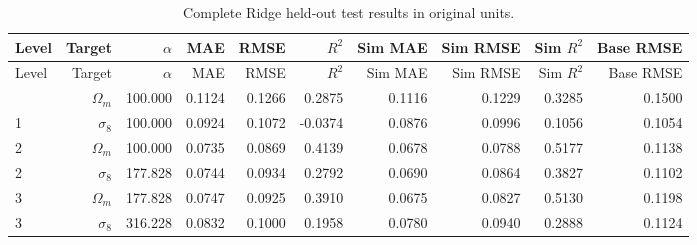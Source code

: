 \begingroup\footnotesize\setlength{\tabcolsep}{3pt}\renewcommand{\arraystretch}{1.05}
\begin{longtable}{lrrrrrrrrr}
\caption{Complete Ridge held-out test results in original units.}\label{tab:ridge}\\
\toprule
Level & Target & $\alpha$ & MAE & RMSE & $R^2$ & Sim MAE & Sim RMSE & Sim $R^2$ & Base RMSE \\
\midrule
\endfirsthead
\toprule
Level & Target & $\alpha$ & MAE & RMSE & $R^2$ & Sim MAE & Sim RMSE & Sim $R^2$ & Base RMSE \\
\midrule\endhead
\bottomrule\endfoot
1 & $\Omega_m$ & 100.000 & 0.1124 & 0.1266 & 0.2875 & 0.1116 & 0.1229 & 0.3285 & 0.1500 \\
1 & $\sigma_8$ & 100.000 & 0.0924 & 0.1072 & -0.0374 & 0.0876 & 0.0996 & 0.1056 & 0.1054 \\
2 & $\Omega_m$ & 100.000 & 0.0735 & 0.0869 & 0.4139 & 0.0678 & 0.0788 & 0.5177 & 0.1138 \\
2 & $\sigma_8$ & 177.828 & 0.0744 & 0.0934 & 0.2792 & 0.0690 & 0.0864 & 0.3827 & 0.1102 \\
3 & $\Omega_m$ & 177.828 & 0.0747 & 0.0925 & 0.3910 & 0.0675 & 0.0827 & 0.5130 & 0.1198 \\
3 & $\sigma_8$ & 316.228 & 0.0832 & 0.1000 & 0.1958 & 0.0780 & 0.0940 & 0.2888 & 0.1124 \\
\end{longtable}\endgroup
